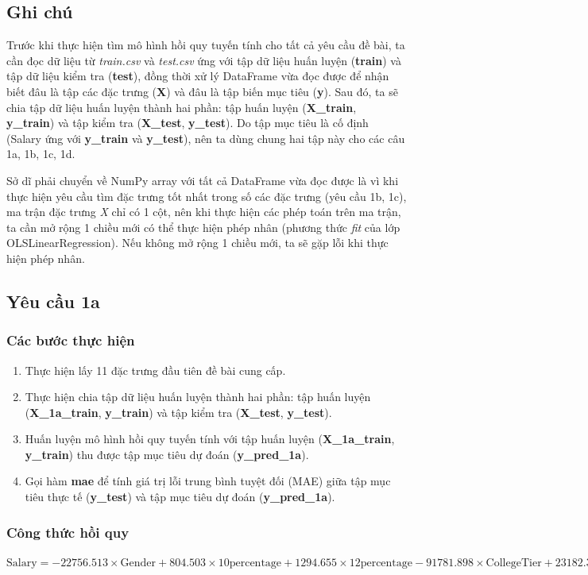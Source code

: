 \documentclass[]{article}
\begin{document}
\subsection{Ghi chú}
Trước khi thực hiện tìm mô hình hồi quy tuyến tính cho tất cả yêu cầu đề bài, ta cần đọc dữ liệu từ \textit{train.csv} và \textit{test.csv} ứng với tập dữ liệu huấn luyện (\textbf{train}) và tập dữ liệu kiểm tra (\textbf{test}), đồng thời xử lý DataFrame vừa đọc được để nhận biết đâu là tập các đặc trưng (\textbf{X}) và đâu là tập biến mục tiêu (\textbf{y}). Sau đó, ta sẽ chia tập dữ liệu huấn luyện thành hai phần: tập huấn luyện (\textbf{X\_train}, \textbf{y\_train}) và tập kiểm tra (\textbf{X\_test}, \textbf{y\_test}). Do tập mục tiêu là cố định (Salary ứng với \textbf{y\_train} và \textbf{y\_test}), nên ta dùng chung hai tập này cho các câu 1a, 1b, 1c, 1d. 

Sở dĩ phải chuyển về NumPy array với tất cả DataFrame vừa đọc được là vì khi thực hiện yêu cầu tìm đặc trưng tốt nhất trong số các đặc trưng (yêu cầu 1b, 1c), ma trận đặc trưng \textit{X} chỉ có 1 cột, nên khi thực hiện các phép toán trên ma trận, ta cần mở rộng 1 chiều mới có thể thực hiện phép nhân (phương thức \textit{fit} của lớp OLSLinearRegression). Nếu không mở rộng 1 chiều mới, ta sẽ gặp lỗi khi thực hiện phép nhân.

\subsection{Yêu cầu 1a}
\subsubsection{Các bước thực hiện}
\begin{enumerate}
  \item Thực hiện lấy 11 đặc trưng đầu tiên đề bài cung cấp.
  \item Thực hiện chia tập dữ liệu huấn luyện thành hai phần: tập huấn luyện (\textbf{X\_1a\_train}, \textbf{y\_train}) và tập kiểm tra (\textbf{X\_test}, \textbf{y\_test}).
  \item Huấn luyện mô hình hồi quy tuyến tính với tập huấn luyện (\textbf{X\_1a\_train}, \textbf{y\_train}) thu được tập mục tiêu dự đoán (\textbf{y\_pred\_1a}).
  \item Gọi hàm \textbf{mae} để tính giá trị lỗi trung bình tuyệt đối (MAE) giữa tập mục tiêu thực tế (\textbf{y\_test}) và tập mục tiêu dự đoán (\textbf{y\_pred\_1a}).
\end{enumerate}
\subsubsection{Công thức hồi quy}
$\text{Salary} = -22756.513 \times \text{Gender} + 804.503 \times \text{10percentage} + 1294.655 \times \text{12percentage} -91781.898 \times \text{CollegeTier} + 23182.389 \times \text{Degree} + 1437.549 \times \text{collegeGPA} -8570.662 \times \text{CollegeCityTier} + 147.858 \times \text{English} + 152.888 \times \text{Logical} + 117.222 \times \text{Quant} + 34552.286 \times \text{Domain}$
\end{document}
